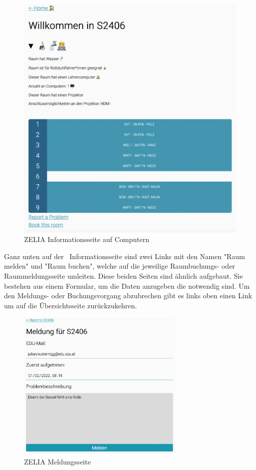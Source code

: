\begin{figure}[H]
    \centering
    \includegraphics[width=120mm]{media/WebComponents/Rauminformationsseite.png}
    \caption{ZELIA Informationsseite auf Computern}
    \label{fig:zeliainfopage}
\end{figure}

Ganz unten auf der \ZELIA\ Informationsseite sind zwei Links mit den Namen "Raum melden" und "Raum buchen", welche auf die jeweilige Raumbuchungs- oder Raummeldungsseite umleiten. Diese beiden Seiten sind ähnlich aufgebaut. Sie bestehen aus einem Formular, um die Daten anzugeben die notwendig sind. Um den Meldungs- oder Buchungsvorgang abzubrechen gibt es links oben einen Link um auf die Übersichtsseite zurückzukehren.

\begin{figure}[H]
    \centering
    \includegraphics[width=80mm]{media/WebComponents/Meldungsseite_light.png}
    \caption{ZELIA Meldungsseite}
    
\end{figure}

